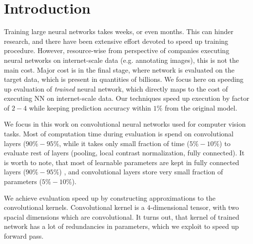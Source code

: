 \documentclass{article}
\begin{document}
 




\begin{abstract}

\end{abstract}

\section{Introduction}

Training large neural networks takes weeks, or even months. This can hinder 
research, and there have been extensive effort devoted to speed up training procedure.
However, resource-wise from perspective of companies executing neural networks on internet-scale
data (e.g. annotating images), this is not the main cost. Major cost is in the
final stage, where network is evaluated on the target data, which is present in quantities of billions.
We focus here on speeding up evaluation of \emph{trained} neural network, which directly
maps to the cost of executing NN on internet-scale data. Our techniques speed up execution by 
factor of $2-4$ while keeping prediction accuracy within $1\%$ from the original model. 




We focus in this work on convolutional neural networks used for computer vision tasks. Most of
computation time during evaluation is spend on convolutional layers ($90\% - 95\%$, while it takes only
small fraction of time ($5\%-10\%$) to evaluate rest of layers (pooling, local contrast normalization,
fully connected). It is worth to note, that most of learnable parameters are kept in fully connected layers ($90\% - 95\%$)
, and convolutional layers store very small fraction of parameters ($5\% - 10\%$).


We achieve evaluation speed up by constructing approximations to the convolutional kernels. Convolutional kernel
is a $4$-dimensional tensor, with two spacial dimensions which are convolutional. It turns out, that kernel of trained
network has a lot of redundancies in parameters, which we exploit to speed up forward pass.
\end{document}
